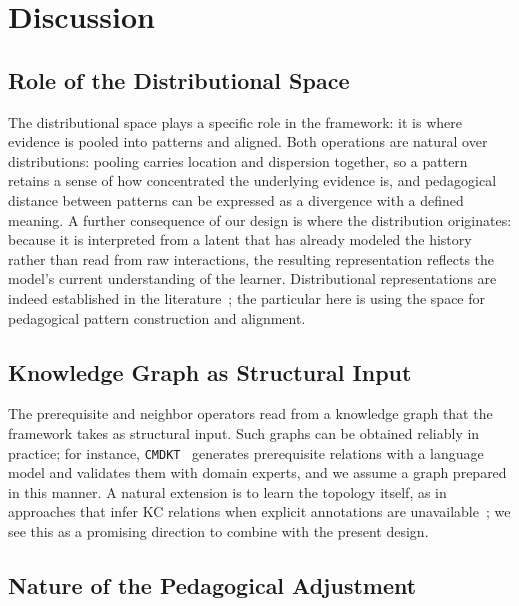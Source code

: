 \documentclass[conference]{IEEEtran}
\begin{document}
\section{Discussion}
\label{sec:discussion}

\subsection{Role of the Distributional Space}
\label{sec:disc-dist}

The distributional space plays a specific role in the framework: it is where evidence is pooled into patterns and aligned. Both operations are natural over distributions: pooling carries location and dispersion together, so a pattern retains a sense of how concentrated the underlying evidence is, and pedagogical distance between patterns can be expressed as a divergence with a defined meaning. A further consequence of our design is where the distribution originates: because it is interpreted from a latent that has already modeled the history rather than read from raw interactions, the resulting representation reflects the model's current understanding of the learner. Distributional representations are indeed established in the literature~\cite{chen2025ukt, li2025keenkt, wu2026sskt}; the particular here is using the space for pedagogical pattern construction and alignment.

\subsection{Knowledge Graph as Structural Input}
\label{sec:disc-kg}

The prerequisite and neighbor operators read from a knowledge graph that the framework takes as structural input. Such graphs can be obtained reliably in practice; for instance, \texttt{CMDKT}~\cite{xia2025cmdkt} generates prerequisite relations with a language model and validates them with domain experts, and we assume a graph prepared in this manner. A natural extension is to learn the topology itself, as in approaches that infer KC relations when explicit annotations are unavailable~\cite{wu2026sskt}; we see this as a promising direction to combine with the present design.

\subsection{Nature of the Pedagogical Adjustment}
\label{sec:disc-soft}
\end{document}
